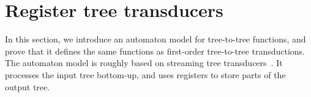 


\section{Register tree transducers}
\label{sec:stt}
In this section, we introduce an automaton model for tree-to-tree functions, and prove that it defines the same functions as first-order tree-to-tree transductions. 
The automaton model is roughly based on streaming tree transducers~\cite{alur2017streaming}.
It processes the input tree bottom-up, and uses registers to store parts of the output tree.

%
%


